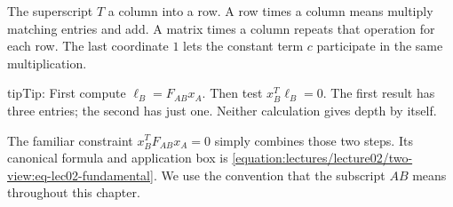 \documentclass[letterpaper,11pt,english,openany,oneside]{jupyterBook}
\begin{document}
\sphinxAtStartPar
The superscript \(T\)  a column into a row. A row times a column means multiply matching entries and add. A matrix times a column repeats that operation for each row. The last coordinate \(1\) lets the constant term \(c\) participate in the same multiplication.


\begin{sphinxadmonition}{tip}{Tip:}
\sphinxAtStartPar
{} First compute \(\ell_B=F_{AB}x_A\). Then test \(x_B^T\ell_B=0\). The first result has three entries; the second has just one. Neither calculation gives depth by itself.
\end{sphinxadmonition}

\sphinxAtStartPar
The familiar constraint \(x_B^TF_{AB}x_A=0\) simply combines those two steps. Its canonical formula and application box is \eqref{equation:lectures/lecture02/two-view:eq-lec02-fundamental}. We use the convention that the subscript \(AB\) means  throughout this chapter.
\end{document}
